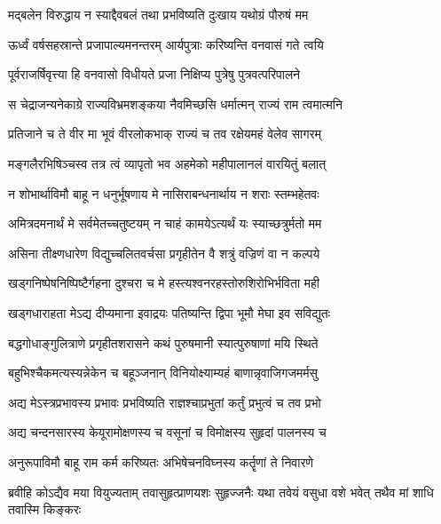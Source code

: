 \twolineshloka
{मद्बलेन विरुद्धाय न स्याद्दैवबलं तथा}
{प्रभविष्यति दुःखाय यथोग्रं पौरुषं मम} %

\twolineshloka
{ऊर्ध्वं वर्षसहस्रान्ते प्रजापाल्यमनन्तरम्}
{आर्यपुत्राः करिष्यन्ति वनवासं गते त्वयि} %

\twolineshloka
{पूर्वराजर्षिवृत्त्या हि वनवासो विधीयते}
{प्रजा निक्षिप्य पुत्रेषु पुत्रवत्परिपालने} %

\twolineshloka
{स चेद्राजन्यनेकाग्रे राज्यविभ्रमशङ्कया}
{नैवमिच्छसि धर्मात्मन् राज्यं राम त्वमात्मनि} %

\twolineshloka
{प्रतिजाने च ते वीर मा भूवं वीरलोकभाक्}
{राज्यं च तव रक्षेयमहं वेलेव सागरम्} %

\twolineshloka
{मङ्गलैरभिषिञ्चस्व तत्र त्वं व्यापृतो भव}
{अहमेको महीपालानलं वारयितुं बलात्} %

\twolineshloka
{न शोभार्थाविमौ बाहू न धनुर्भूषणाय मे}
{नासिराबन्धनार्थाय न शराः स्तम्भहेतवः} %

\twolineshloka
{अमित्रदमनार्थं मे सर्वमेतच्चतुष्टयम्}
{न चाहं कामयेऽत्यर्थं यः स्याच्छत्रुर्मतो मम} %

\twolineshloka
{असिना तीक्ष्णधारेण विद्युच्चलितवर्चसा}
{प्रगृहीतेन वै शत्रुं वज्रिणं वा न कल्पये} %

\twolineshloka
{खड्गनिष्पेषनिष्पिष्टैर्गहना दुश्चरा च मे}
{हस्त्यश्वनरहस्तोरुशिरोभिर्भविता मही} %

\twolineshloka
{खड्गधाराहता मेऽद्य दीप्यमाना इवाद्रयः}
{पतिष्यन्ति द्विपा भूमौ मेघा इव सविद्युतः} %

\twolineshloka
{बद्धगोधाङ्गुलित्राणे प्रगृहीतशरासने}
{कथं पुरुषमानी स्यात्पुरुषाणां मयि स्थिते} %

\twolineshloka
{बहुभिश्चैकमत्यस्यन्नेकेन च बहूञ्जनान्}
{विनियोक्ष्याम्यहं बाणान्नृवाजिगजमर्मसु} %

\twolineshloka
{अद्य मेऽस्त्रप्रभावस्य प्रभावः प्रभविष्यति}
{राज्ञश्चाप्रभुतां कर्तुं प्रभुत्वं च तव प्रभो} %

\twolineshloka
{अद्य चन्दनसारस्य केयूरामोक्षणस्य च}
{वसूनां च विमोक्षस्य सुहृदां पालनस्य च} %

\twolineshloka
{अनुरूपाविमौ बाहू राम कर्म करिष्यतः}
{अभिषेचनविघ्नस्य कर्तॄणां ते निवारणे} %

\fourlineindentedshloka
{ब्रवीहि कोऽद्यैव मया वियुज्यताम्}
{तवासुहृत्प्राणयशः सुहृज्जनैः}
{यथा तवेयं वसुधा वशे भवेत्}
{तथैव मां शाधि तवास्मि किङ्करः} %

